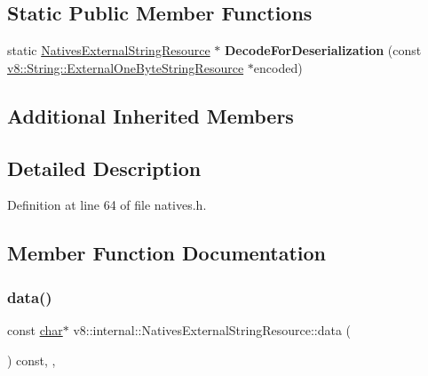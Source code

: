 \subsection*{Static Public Member Functions}
\begin{DoxyCompactItemize}
\item 
\mbox{\label{classv8_1_1internal_1_1NativesExternalStringResource_a64948ba3b56877c800a86f2b836b27f8}} 
static \mbox{\hyperlink{classv8_1_1internal_1_1NativesExternalStringResource}{Natives\+External\+String\+Resource}} $\ast$ {\bfseries Decode\+For\+Deserialization} (const \mbox{\hyperlink{classv8_1_1String_1_1ExternalOneByteStringResource}{v8\+::\+String\+::\+External\+One\+Byte\+String\+Resource}} $\ast$encoded)
\end{DoxyCompactItemize}
\subsection*{Additional Inherited Members}


\subsection{Detailed Description}


Definition at line 64 of file natives.\+h.



\subsection{Member Function Documentation}
\mbox{\label{classv8_1_1internal_1_1NativesExternalStringResource_a80047e38c07b82d4632e7f0e35ff24b0}} 
\subsubsection{\texorpdfstring{data()}{data()}}
{\footnotesize\ttfamily const \mbox{\hyperlink{classchar}{char}}$\ast$ v8\+::internal\+::\+Natives\+External\+String\+Resource\+::data (\begin{DoxyParamCaption}{ }\end{DoxyParamCaption}) const\hspace{0.3cm}{\ttfamily [inline]}, {\ttfamily [override]}, {\ttfamily [virtual]}}

